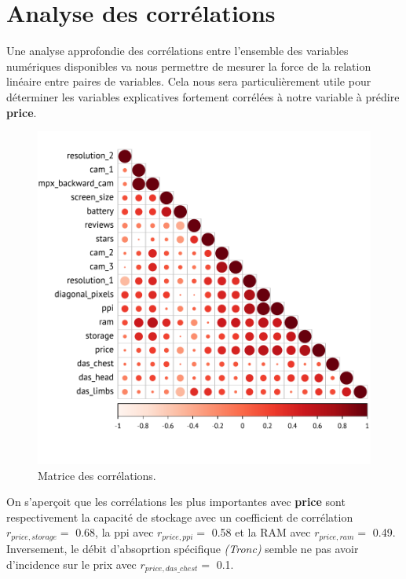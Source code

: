 \documentclass[
  12pt,
]{report}
\begin{document}
\newpage

\section{Analyse des corrélations}\label{analyse-des-corruxe9lations}

Une analyse approfondie des corrélations entre l'ensemble des variables
numériques disponibles va nous permettre de mesurer la force de la
relation linéaire entre paires de variables. Cela nous sera
particulièrement utile pour déterminer les variables explicatives
fortement corrélées à notre variable à prédire \textbf{price}.

\begin{figure}[H]

{\centering \includegraphics{report_files/figure-pdf/correlation-1.pdf}

}

\caption{Matrice des corrélations.}

\end{figure}%

On s'aperçoit que les corrélations les plus importantes avec
\textbf{price} sont respectivement la capacité de stockage avec un
coefficient de corrélation \(r_{price, storage}=\) 0.68, la ppi avec
\(r_{price, ppi}=\) 0.58 et la RAM avec \(r_{price, ram}=\) 0.49.
Inversement, le débit d'absoprtion spécifique \emph{(Tronc)} semble ne
pas avoir d'incidence sur le prix avec \(r_{price, das\_chest}=\) 0.1.
\end{document}
